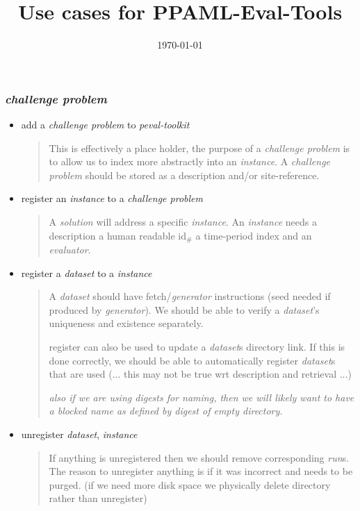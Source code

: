 \documentclass[11pt]{article} %
\title{Use cases for PPAML-Eval-Tools}
\date{\today}
\author{\pmr}
\newenvironment{slimlist}{
  \begin{itemize}
    \setlength{\topsep}{0pt}
    \setlength{\itemsep}{1pt}
    \setlength{\parsep}{0pt}
    \setlength{\parskip}{0pt}
}{\end{itemize}}
\newenvironment{mitemize}[1]{
  \begin{minipage}{\linewidth}
  \subsubsection*{#1}
  \begin{slimlist}
    \def\dfn{\item[def{\bf:}]}
}{\end{slimlist}\end{minipage}}
\begin{document}
\pagestyle{empty}
\clearpage\maketitle
  

\newcommand{\form}[1]{{\em #1}\xspace}
\def\ptk{\form{peval-toolkit}}
\def\cp{\form{challenge problem}}
\def\ev{\form{evaluator}}
\def\ds{\form{dataset}}
\def\ins{\form{instance}}
\def\sol{\form{solution}}
\def\gen{\form{generator}}
\def\out{\form{output}}
\def\tm{\form{team}}
\def\rn{\form{run}}
\def\eng{\form{engine}}


\begin{mitemize}{\cp}
\item add a \cp to \ptk
  \begin{quote}
    This is effectively a place holder, the purpose of a \cp is to allow us to index more abstractly into an \ins. A \cp should be stored as a description and/or site-reference. 
    \end{quote}
\item register an \ins to a \cp
  \begin{quote}
    A \sol will address a specific \ins. An \ins needs a description a human readable id$_\#$ a time-period index and an \ev. 
    
  \end{quote}
\item register a \ds to a \ins
  \begin{quote}
    A \ds should have fetch/\gen instructions (seed needed if produced by \gen). We should be able to verify a \ds's uniqueness and existence separately.
    
    register can also be used to update a \ds{s} directory link. If this is done correctly, we should be able to automatically register \ds{s} that are used (... this may not be true wrt description and retrieval ...)

    {\em\footnotesize also if we are using digests for naming, then we will likely want to have a blocked name as defined by digest of empty directory.}
  \end{quote}
\item unregister \ds, \ins
  \begin{quote}
    If anything is unregistered then we should remove corresponding \rn{s}. The reason to unregister anything is if it was incorrect and needs to be purged. (if we need more disk space we physically delete directory rather than unregister)
  \end{quote}
  

\end{mitemize}
\end{document}
